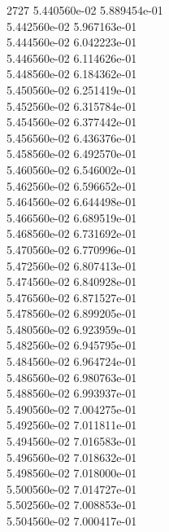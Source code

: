 2727	5.440560e-02	5.889454e-01	\\ 	5.442560e-02	5.967163e-01	\\ 	5.444560e-02	6.042223e-01	\\ 	5.446560e-02	6.114626e-01	\\ 	5.448560e-02	6.184362e-01	\\ 	5.450560e-02	6.251419e-01	\\ 	5.452560e-02	6.315784e-01	\\ 	5.454560e-02	6.377442e-01	\\ 	5.456560e-02	6.436376e-01	\\ 	5.458560e-02	6.492570e-01	\\ 	5.460560e-02	6.546002e-01	\\ 	5.462560e-02	6.596652e-01	\\ 	5.464560e-02	6.644498e-01	\\ 	5.466560e-02	6.689519e-01	\\ 	5.468560e-02	6.731692e-01	\\ 	5.470560e-02	6.770996e-01	\\ 	5.472560e-02	6.807413e-01	\\ 	5.474560e-02	6.840928e-01	\\ 	5.476560e-02	6.871527e-01	\\ 	5.478560e-02	6.899205e-01	\\ 	5.480560e-02	6.923959e-01	\\ 	5.482560e-02	6.945795e-01	\\ 	5.484560e-02	6.964724e-01	\\ 	5.486560e-02	6.980763e-01	\\ 	5.488560e-02	6.993937e-01	\\ 	5.490560e-02	7.004275e-01	\\ 	5.492560e-02	7.011811e-01	\\ 	5.494560e-02	7.016583e-01	\\ 	5.496560e-02	7.018632e-01	\\ 	5.498560e-02	7.018000e-01	\\ 	5.500560e-02	7.014727e-01	\\ 	5.502560e-02	7.008853e-01	\\ 	5.504560e-02	7.000417e-01	\\ \hline
